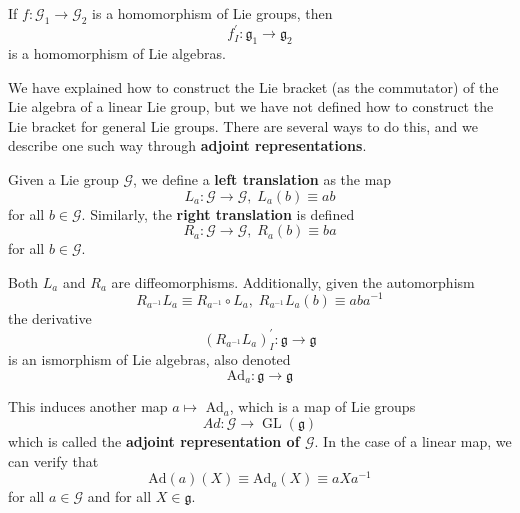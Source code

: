 \documentclass{article}
\DeclareMathOperator{\GL}{GL}
\begin{document}
    \begin{proposition}
      If $f: \mathcal{G}_1 \longrightarrow \mathcal{G}_2$ is a homomorphism of Lie groups, then 
      \begin{equation}
        f_I^\prime: \mathfrak{g}_1 \longrightarrow \mathfrak{g}_2
      \end{equation}
      is a homomorphism of Lie algebras. 
    \end{proposition}

    We have explained how to construct the Lie bracket (as the commutator) of the Lie algebra of a linear Lie group, but we have not defined how to construct the Lie bracket for general Lie groups. There are several ways to do this, and we describe one such way through \textbf{adjoint representations}. 

    \begin{definition}
      Given a Lie group $\mathcal{G}$, we define a \textbf{left translation} as the map
      \begin{equation}
        L_a: \mathcal{G} \longrightarrow \mathcal{G}, \; L_a (b) \equiv a b
      \end{equation}
      for all $b \in \mathcal{G}$. Similarly, the \textbf{right translation} is defined
      \begin{equation}
        R_a: \mathcal{G} \longrightarrow \mathcal{G}, \; R_a (b) \equiv b a
      \end{equation}
      for all $b \in \mathcal{G}$. 
    \end{definition}

    Both $L_a$ and $R_a$ are diffeomorphisms. Additionally, given the automorphism
    \begin{equation}
      R_{a^{-1}} L_a \equiv R_{a^{-1}} \circ L_a, \; R_{a^{-1}} L_a (b) \equiv a b a^{-1}
    \end{equation}
    the derivative
    \begin{equation}
      (R_{a^{-1}} L_a)^\prime_I: \mathfrak{g} \longrightarrow \mathfrak{g}
    \end{equation}
    is an ismorphism of Lie algebras, also denoted 
    \begin{equation}
      \text{Ad}_a: \mathfrak{g} \longrightarrow \mathfrak{g}
    \end{equation}

    \begin{definition}
      This induces another map $a \mapsto$ Ad$_a$, which is a map of Lie groups
      \begin{equation}
        Ad: \mathcal{G} \longrightarrow \GL(\mathcal{\mathfrak{g}})
      \end{equation}
      which is called the \textbf{adjoint representation of $\mathcal{G}$}. In the case of a linear map, we can verify that 
      \begin{equation}
        \text{Ad}(a) (X) \equiv \text{Ad}_a (X) \equiv a X a^{-1}
      \end{equation}
      for all $a \in \mathcal{G}$ and for all $X \in \mathfrak{g}$. 
    \end{definition}
\end{document}
